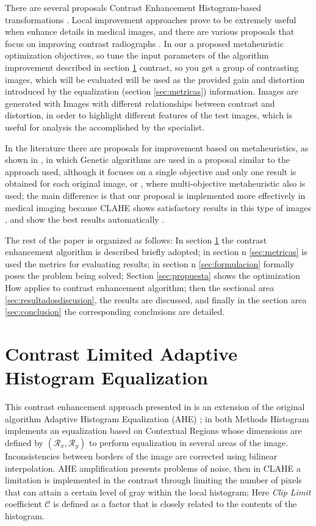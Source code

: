 \documentclass[spanish,twocolumn]{article}
\begin{document}
There are several proposals Contrast Enhancement Histogram-based transformations \cite{1658094}. Local improvement approaches prove to be extremely useful when enhance details in medical images, and there are various proposals that focus on improving contrast radiographs  \cite{1625082,4712472,5360176}. In our a proposed metaheuristic optimization objectives, so tune the input parameters of the algorithm improvement described in section \ref{sec:clahe} contrast, so you get a group of contrasting images, which will be evaluated will be used as the provided gain and distortion introduced by the equalization (section \ref{sec:metricas}) information. Images are generated with Images with different relationships between contrast and distortion, in order to highlight different features of the test images, which is useful for analysis the accomplished by the specialist.

In the literature there are proposals for improvement based on metaheuristics, as shown in \cite{Hashemi20101816}, in which Genetic algorithms are used in \cite{morebrizuela2014} a proposal similar to the approach used, although it focuses on a single objective and only one result is obtained for each original image, or \cite{Shanmugavadivu2014243}, where multi-objective metaheuristic also is used; the main difference is that our proposal is implemented more effectively in medical imaging because CLAHE shows satisfactory results in this type of images \cite{reza2004,5360176}, and show the best results automatically .

The rest of the paper is organized as follows: In section \ref{sec:clahe} the contrast enhancement algorithm is described briefly adopted; in section n \ref{sec:metricas} is used the metrics for evaluating results; in section n \ref{sec:formulacion} formally poses the problem being solved; Section \ref{sec:propuesta} shows the optimization How applies to contrast enhancement algorithm; then the sectional area \ref{sec:resultadosdiscusion}, the results are discussed, and finally in the section area \ref{sec:conclusion} the corresponding conclusions are detailed. 


\section{Contrast Limited Adaptive Histogram Equalization}
\label{sec:clahe}

This contrast enhancement approach presented in  \cite{Zuiderveld:1994:CLA:180895.180940} is an extension of the original algorithm Adaptive Histogram Equalization (AHE) \cite{pizer1987adaptive}; in both Methods Histogram implements an equalization based on Contextual Regions whose dimensions are defined by $(\mathcal{R}_x, \mathcal{R}_y)$ to perform equalization in several areas of the image. Inconsistencies between borders of the image are corrected using bilinear interpolation. AHE amplification presents problems of noise, then in CLAHE a limitation is implemented in the contrast through limiting the number of pixels that can attain a certain level of gray within the local histogram; Here {\it Clip Limit} coefficient $\mathcal{C}$ is defined as a factor that is closely related to the contents of the histogram.
\end{document}
